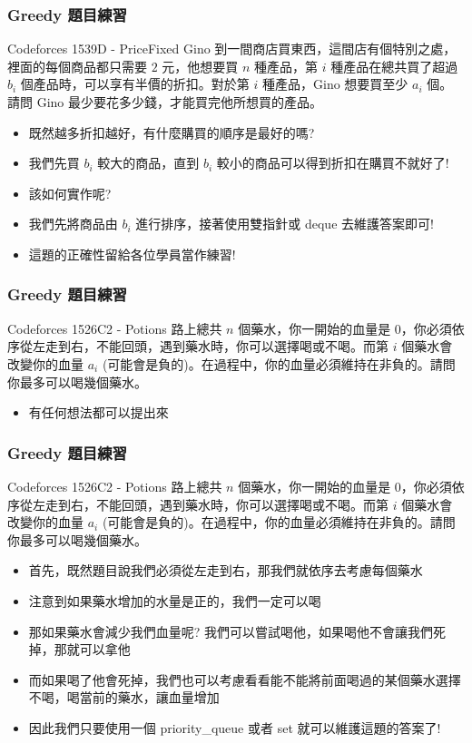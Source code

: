 \documentclass[aspectratio=169]{beamer}
\begin{document}
\begin{frame}
\frametitle{Greedy 題目練習}
    \begin{block}{Codeforces 1539D - PriceFixed}
        Gino 到一間商店買東西，這間店有個特別之處，裡面的每個商品都只需要 $2$ 元，他想要買 $n$ 種產品，第 $i$ 種產品在總共買了超過 $b_i$ 個產品時，可以享有半價的折扣。對於第 $i$ 種產品，Gino 想要買至少 $a_i$ 個。請問 Gino 最少要花多少錢，才能買完他所想買的產品。
    \end{block}
    \begin{itemize}
        \item<1-> 既然越多折扣越好，有什麼購買的順序是最好的嗎?
        \item<2-> 我們先買 $b_i$ 較大的商品，直到 $b_i$ 較小的商品可以得到折扣在購買不就好了!
        \item<3-> 該如何實作呢? 
        \item<4-> 我們先將商品由 $b_i$ 進行排序，接著使用雙指針或 deque 去維護答案即可!
        \item<5-> 這題的正確性留給各位學員當作練習!
    \end{itemize}
    
\end{frame}

\begin{frame}
\frametitle{Greedy 題目練習}
    \begin{block}{Codeforces 1526C2 - Potions}
        路上總共 $n$ 個藥水，你一開始的血量是 $0$，你必須依序從左走到右，不能回頭，遇到藥水時，你可以選擇喝或不喝。而第 $i$ 個藥水會改變你的血量 $a_i$ (可能會是負的)。在過程中，你的血量必須維持在非負的。請問你最多可以喝幾個藥水。
    \end{block}
    \begin{itemize}
        \item 有任何想法都可以提出來
    \end{itemize}
\end{frame}

\begin{frame}
\frametitle{Greedy 題目練習}
    \begin{block}{Codeforces 1526C2 - Potions}
        路上總共 $n$ 個藥水，你一開始的血量是 $0$，你必須依序從左走到右，不能回頭，遇到藥水時，你可以選擇喝或不喝。而第 $i$ 個藥水會改變你的血量 $a_i$ (可能會是負的)。在過程中，你的血量必須維持在非負的。請問你最多可以喝幾個藥水。
    \end{block}
    \begin{itemize}
        \item<1-> 首先，既然題目說我們必須從左走到右，那我們就依序去考慮每個藥水
        \item<2-> 注意到如果藥水增加的水量是正的，我們一定可以喝
        \item<3-> 那如果藥水會減少我們血量呢? 我們可以嘗試喝他，如果喝他不會讓我們死掉，那就可以拿他
        \item<4-> 而如果喝了他會死掉，我們也可以考慮看看能不能將前面喝過的某個藥水選擇不喝，喝當前的藥水，讓血量增加
        \item<5-> 因此我們只要使用一個 priority\_queue 或者 set 就可以維護這題的答案了!
    \end{itemize}
\end{frame}
\end{document}
